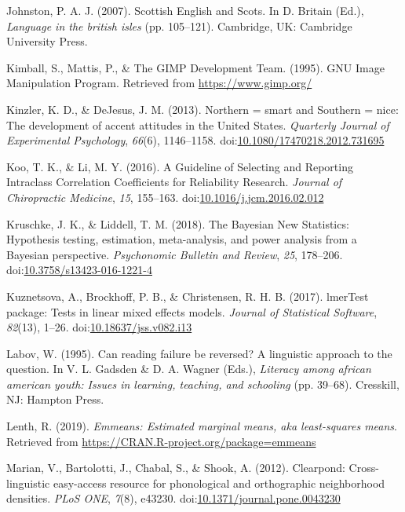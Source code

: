 \documentclass[doc,floatsintext]{apa6}
\begin{document}
\hypertarget{ref-Johnston2007}{}
Johnston, P. A. J. (2007). Scottish English and Scots. In D. Britain
(Ed.), \emph{Language in the british isles} (pp. 105--121). Cambridge,
UK: Cambridge University Press.

\hypertarget{ref-GIMP1995}{}
Kimball, S., Mattis, P., \& The GIMP Development Team. (1995). GNU Image
Manipulation Program. Retrieved from \url{https://www.gimp.org/}

\hypertarget{ref-Kinzler2013}{}
Kinzler, K. D., \& DeJesus, J. M. (2013). Northern = smart and Southern
= nice: The development of accent attitudes in the United States.
\emph{Quarterly Journal of Experimental Psychology}, \emph{66}(6),
1146--1158.
doi:\href{https://doi.org/10.1080/17470218.2012.731695}{10.1080/17470218.2012.731695}

\hypertarget{ref-Koo2016}{}
Koo, T. K., \& Li, M. Y. (2016). A Guideline of Selecting and Reporting
Intraclass Correlation Coefficients for Reliability Research.
\emph{Journal of Chiropractic Medicine}, \emph{15}, 155--163.
doi:\href{https://doi.org/10.1016/j.jcm.2016.02.012}{10.1016/j.jcm.2016.02.012}

\hypertarget{ref-Kruschke2018}{}
Kruschke, J. K., \& Liddell, T. M. (2018). The Bayesian New Statistics:
Hypothesis testing, estimation, meta-analysis, and power analysis from a
Bayesian perspective. \emph{Psychonomic Bulletin and Review}, \emph{25},
178--206.
doi:\href{https://doi.org/10.3758/s13423-016-1221-4}{10.3758/s13423-016-1221-4}

\hypertarget{ref-R-lmerTest}{}
Kuznetsova, A., Brockhoff, P. B., \& Christensen, R. H. B. (2017).
lmerTest package: Tests in linear mixed effects models. \emph{Journal of
Statistical Software}, \emph{82}(13), 1--26.
doi:\href{https://doi.org/10.18637/jss.v082.i13}{10.18637/jss.v082.i13}

\hypertarget{ref-Labov1995}{}
Labov, W. (1995). Can reading failure be reversed? A linguistic approach
to the question. In V. L. Gadsden \& D. A. Wagner (Eds.), \emph{Literacy
among african american youth: Issues in learning, teaching, and
schooling} (pp. 39--68). Cresskill, NJ: Hampton Press.

\hypertarget{ref-R-emmeans}{}
Lenth, R. (2019). \emph{Emmeans: Estimated marginal means, aka
least-squares means}. Retrieved from
\url{https://CRAN.R-project.org/package=emmeans}

\hypertarget{ref-Marian2012}{}
Marian, V., Bartolotti, J., Chabal, S., \& Shook, A. (2012). Clearpond:
Cross-linguistic easy-access resource for phonological and orthographic
neighborhood densities. \emph{PLoS ONE}, \emph{7}(8), e43230.
doi:\href{https://doi.org/10.1371/journal.pone.0043230}{10.1371/journal.pone.0043230}
\end{document}

